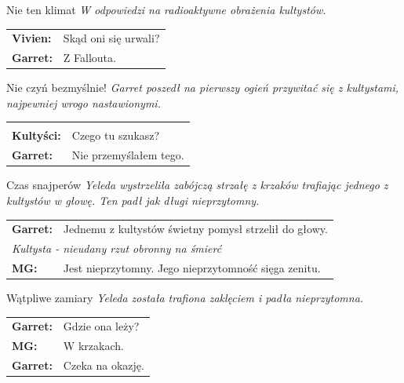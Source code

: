 \documentclass[10pt,twoside,twocolumn]{book}
\begin{document}
    
\begin{rpg-quotebox}{Nie ten klimat}
   \textit{W odpowiedzi na radioaktywne obrażenia kultystów.}\\

   \begin{tabularx}{\columnwidth}{lX}
      \textbf{Vivien:} & Skąd oni się urwali?\\
      \textbf{Garret:} & Z Fallouta.\\
   \end{tabularx}
\end{rpg-quotebox}

   
\begin{rpg-quotebox}{Nie czyń bezmyślnie!}
   \textit{Garret poszedł na pierwszy ogień przywitać się z kultystami, najpewniej wrogo nastawionymi.}\\
   
   \begin{tabularx}{\columnwidth}{lX}
      \multicolumn{2}{l}{\textit{}}\\
      
      \textbf{Kultyści:} & Czego tu szukasz?\\
      \textbf{Garret:} & Nie przemyślałem tego.\\
   \end{tabularx}
\end{rpg-quotebox}


\begin{rpg-quotebox}{Czas snajperów}
   \textit{Yeleda wystrzeliła zabójczą strzałę z krzaków trafiając jednego z kultystów w głowę. Ten padł jak długi nieprzytomny.}\\
   
   \begin{tabularx}{\columnwidth}{lX}
      \textbf{Garret:} & Jednemu z kultystów świetny pomysł strzelił do głowy.\\
      \multicolumn{2}{X}{\textit{Kultysta - nieudany rzut obronny na śmierć}}\\
      \textbf{MG:} & Jest nieprzytomny. Jego nieprzytomność sięga zenitu.\\
   \end{tabularx}
\end{rpg-quotebox}


\begin{rpg-quotebox}{Wątpliwe zamiary}
   \textit{Yeleda została trafiona zaklęciem i padła nieprzytomna.}\\
   
   \begin{tabularx}{\columnwidth}{lX}
      \textbf{Garret:} & Gdzie ona leży?\\
      \textbf{MG:} & W krzakach.\\
      \textbf{Garret:} & Czeka na okazję.\\
   \end{tabularx}
\end{rpg-quotebox}
\end{document}
